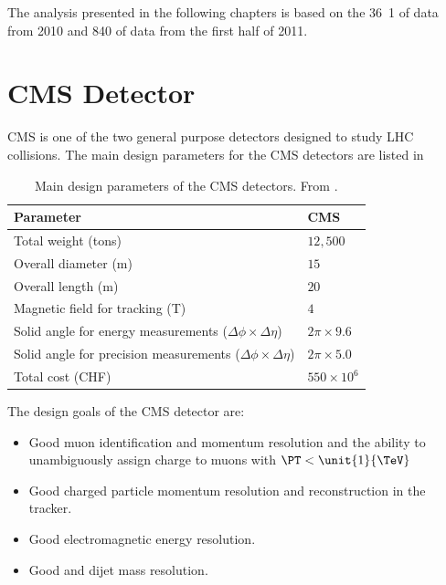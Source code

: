 The analysis presented in the following chapters is based on the \unit{36.1} of
data from  2010 and \unit{840}{\invpb} of data from the first half of 2011.

\section{CMS Detector}
{CMS} is one of the two general purpose
detectors designed to study LHC collisions. The main design parameters for the
{CMS} detectors  are listed in 

\begin{table}[htbp]
\begin{center}
\begin{tabular}{ l l }
\toprule
Parameter & CMS \\
\midrule
Total weight (tons)                 & $12,500$  \\
Overall diameter (m)                & $15$  \\
Overall length (m)                  & $20$  \\
Magnetic field for tracking (T)     & $4$  \\
Solid angle for energy measurements ($\Delta\phi \times \Delta\eta$)   
                                    & $2\pi \times 9.6$  \\
Solid angle for precision measurements ($\Delta\phi \times \Delta\eta$)   
                                    & $2\pi \times 5.0$  \\
Total cost (CHF)                    & $550\times 10 ^{6}$  \\
\bottomrule
\end{tabular}
\caption{Main design parameters of the CMS detectors. From
\cite{froidevaux2006general}.}
\end{center}
\label{tab:cmsparam}
\end{table}

The design goals of the CMS detector are:\cite{chatrchyan2008cms}
\begin{itemize}
  \item Good muon identification and momentum resolution and the ability to
unambiguously assign charge to muons with $\PT < \unit{1}{\TeV}$
  \item Good charged particle momentum resolution and reconstruction in the
tracker.
  \item Good electromagnetic energy resolution. 
  \item Good \ETmiss and dijet mass resolution.
\end{itemize}


